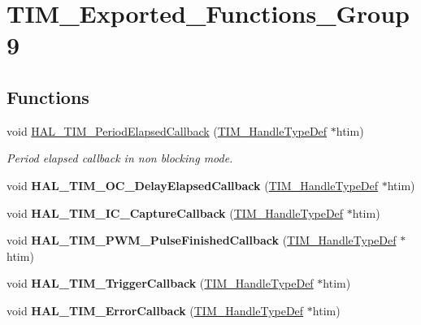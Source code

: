 \hypertarget{group___t_i_m___exported___functions___group9}{}\section{T\+I\+M\+\_\+\+Exported\+\_\+\+Functions\+\_\+\+Group9}
\label{group___t_i_m___exported___functions___group9}
\subsection*{Functions}
\begin{DoxyCompactItemize}
\item 
void \hyperlink{group___t_i_m___exported___functions___group9_ga8a3b0ad512a6e6c6157440b68d395eac}{H\+A\+L\+\_\+\+T\+I\+M\+\_\+\+Period\+Elapsed\+Callback} (\hyperlink{struct_t_i_m___handle_type_def}{T\+I\+M\+\_\+\+Handle\+Type\+Def} $\ast$htim)
\begin{DoxyCompactList}\small\item\em Period elapsed callback in non blocking mode. \end{DoxyCompactList}\item 
\mbox{\label{group___t_i_m___exported___functions___group9_ga1fc39499fe9db8b7fb88005e9f107a36}} 
void {\bfseries H\+A\+L\+\_\+\+T\+I\+M\+\_\+\+O\+C\+\_\+\+Delay\+Elapsed\+Callback} (\hyperlink{struct_t_i_m___handle_type_def}{T\+I\+M\+\_\+\+Handle\+Type\+Def} $\ast$htim)
\item 
\mbox{\label{group___t_i_m___exported___functions___group9_ga77a2401a35ddd9bd0b8fc28331b81381}} 
void {\bfseries H\+A\+L\+\_\+\+T\+I\+M\+\_\+\+I\+C\+\_\+\+Capture\+Callback} (\hyperlink{struct_t_i_m___handle_type_def}{T\+I\+M\+\_\+\+Handle\+Type\+Def} $\ast$htim)
\item 
\mbox{\label{group___t_i_m___exported___functions___group9_ga07e5fc4d223b16bec2fd6bed547cf91d}} 
void {\bfseries H\+A\+L\+\_\+\+T\+I\+M\+\_\+\+P\+W\+M\+\_\+\+Pulse\+Finished\+Callback} (\hyperlink{struct_t_i_m___handle_type_def}{T\+I\+M\+\_\+\+Handle\+Type\+Def} $\ast$htim)
\item 
\mbox{\label{group___t_i_m___exported___functions___group9_ga189577c72b1963671b26820d8161d678}} 
void {\bfseries H\+A\+L\+\_\+\+T\+I\+M\+\_\+\+Trigger\+Callback} (\hyperlink{struct_t_i_m___handle_type_def}{T\+I\+M\+\_\+\+Handle\+Type\+Def} $\ast$htim)
\item 
\mbox{\label{group___t_i_m___exported___functions___group9_ga6f0868af383d592940700dbb52fac016}} 
void {\bfseries H\+A\+L\+\_\+\+T\+I\+M\+\_\+\+Error\+Callback} (\hyperlink{struct_t_i_m___handle_type_def}{T\+I\+M\+\_\+\+Handle\+Type\+Def} $\ast$htim)
\end{DoxyCompactItemize}


